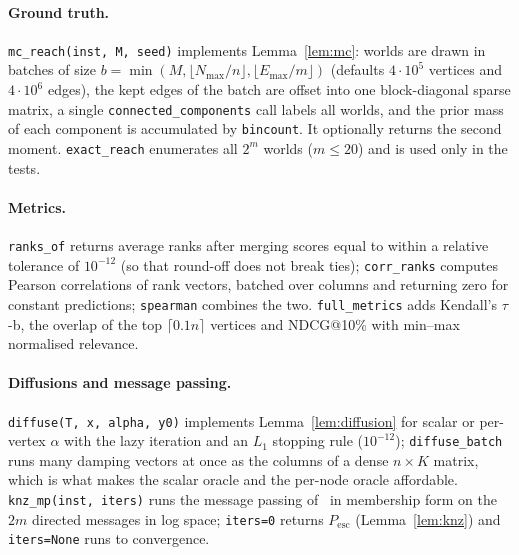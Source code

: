 \documentclass[11pt,a4paper]{article}
\theoremstyle{definition}
\theoremstyle{plain}
\newcommand{\Pesc}{P_{\mathrm{esc}}}
\begin{document}
\paragraph{Ground truth.} \texttt{mc\_reach(inst, M, seed)} implements Lemma~\ref{lem:mc}: worlds are drawn in batches of size $b=\min(M,\lfloor N_{\max}/n\rfloor,\lfloor E_{\max}/m\rfloor)$ (defaults $4\cdot10^5$ vertices and $4\cdot10^6$ edges), the kept edges of the batch are offset into one block-diagonal sparse matrix, a single \texttt{connected\_components} call labels all worlds, and the prior mass of each component is accumulated by \texttt{bincount}. It optionally returns the second moment. \texttt{exact\_reach} enumerates all $2^m$ worlds ($m\le20$) and is used only in the tests.

\paragraph{Metrics.} \texttt{ranks\_of} returns average ranks after merging scores equal to within a relative tolerance of $10^{-12}$ (so that round-off does not break ties); \texttt{corr\_ranks} computes Pearson correlations of rank vectors, batched over columns and returning zero for constant predictions; \texttt{spearman} combines the two. \texttt{full\_metrics} adds Kendall's $\tau$-b, the overlap of the top $\lceil0.1n\rceil$ vertices and NDCG@10\% with min--max normalised relevance.

\paragraph{Diffusions and message passing.} \texttt{diffuse(T, x, alpha, y0)} implements Lemma~\ref{lem:diffusion} for scalar or per-vertex $\alpha$ with the lazy iteration and an $L_1$ stopping rule ($10^{-12}$); \texttt{diffuse\_batch} runs many damping vectors at once as the columns of a dense $n\times K$ matrix, which is what makes the scalar oracle and the per-node oracle affordable. \texttt{knz\_mp(inst, iters)} runs the message passing of~\cite{knz14} in membership form on the $2m$ directed messages in log space; \texttt{iters=0} returns $\Pesc$ (Lemma~\ref{lem:knz}) and \texttt{iters=None} runs to convergence.
\end{document}
